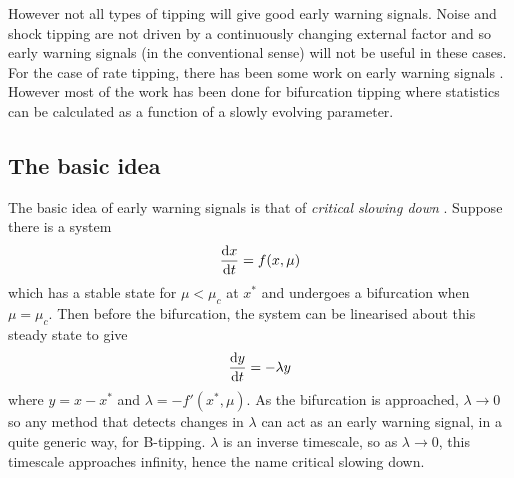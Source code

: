 However not all types of tipping will give good early warning signals. Noise and shock tipping are not driven by a continuously changing external factor and
so early warning signals (in the conventional sense) will not be useful in these cases. For the case of rate tipping, there has been some work on
early warning signals \parencite{Ritchie2016}. However most of the work has been done
for bifurcation tipping where statistics can be calculated as a function of a slowly evolving parameter.

\subsection{The basic idea}
The basic idea of early warning signals is that of \emph{critical slowing down} \parencite{Dakos2008}. Suppose there is a system
\begin{equation}
  \label{eq:system}
  \dv{x}{t} = f(x,\mu)
\end{equation}
which has a stable state for $\mu < \mu_c$ at $x^*$ and undergoes a bifurcation when $\mu=\mu_c$. Then before the bifurcation, the system can be linearised about this steady state
to give
\begin{equation}
  \label{eq:linearised_about_steady_state}
  \dv{y}{t} = -\lambda y
\end{equation}
where $y = x -x^*$ and $\lambda = -f'(x^*,\mu)$. As the bifurcation is approached, $\lambda \rightarrow 0$ so any method that detects changes in $\lambda$ can act as an early warning
signal, in a quite generic way, for B-tipping. $\lambda$ is an inverse timescale, so as $\lambda \rightarrow 0$, this timescale approaches infinity, hence the name critical slowing down.


